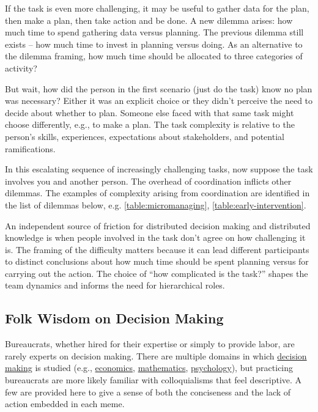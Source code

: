If the task is even more challenging, it may be useful to gather data for the plan, then make a plan, then take action and be done. A new dilemma arises: how much time to spend gathering data versus planning. The previous dilemma still exists -- how much time to invest in planning versus doing. As an alternative to the dilemma framing, how much time should be allocated to three categories of activity?

But wait, how did the person in the first scenario (just do the task) know no plan was necessary? Either it was an explicit choice or they didn't perceive the need to decide about whether to plan. Someone else faced with that same task might choose differently, e.g., to make a plan. The task complexity is relative to the person's skills, experiences, expectations about stakeholders, and potential ramifications.

In this escalating sequence of increasingly challenging tasks, now suppose the task involves you and another person. The overhead of coordination inflicts other dilemmas. The examples of complexity arising from coordination are identified in the list of dilemmas below, e.g. \ref{table:micromanaging}, \ref{table:early-intervention}.

An independent source of friction for distributed decision making and distributed knowledge is when people involved in the task don't agree on how challenging it is. The framing of the difficulty matters because it can lead different participants to distinct conclusions about how much time should be spent planning versus for carrying out the action. The choice of ``how complicated is the task?'' shapes the team dynamics and informs the need for hierarchical roles. 

\subsection*{Folk Wisdom on Decision Making}

Bureaucrats, whether hired for their expertise or simply to provide labor, are rarely experts on decision making. There are multiple domains in which \href{https://en.wikipedia.org/wiki/Decision_theory}{decision making} is studied (e.g., \href{https://en.wikipedia.org/wiki/Rational_choice_theory}{economics}, \href{https://en.wikipedia.org/wiki/Game_theory}{mathematics}, \href{https://en.wikipedia.org/wiki/Decision-making}{psychology}), but practicing bureaucrats are more likely familiar with colloquialisms that feel descriptive. A few are provided here to give a sense of both the conciseness and the lack of action embedded in each meme.

